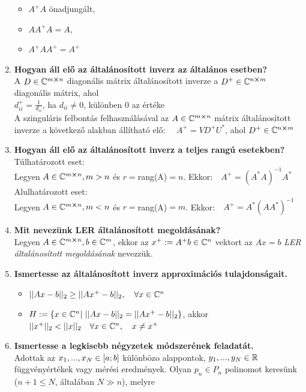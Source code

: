 \documentclass{article}
\begin{document}
\begin{enumerate}
\begin{itemize}
		\item $A^+A$ önadjungált,
		\item $AA^+A=A$,
		\item $A^+AA^+=A^+$
	\end{itemize}
	\item\textbf{Hogyan áll elő az általánosított inverz az általános esetben?}\\[0.1cm]
	A $D\in\mathbb{C}^{m\cross n}$ diagonális mátrix általánosított inverze a $D^+\in\mathbb{C}^{n\cross m}$
	diagonális mátrix, ahol\\[0.1cm]$d_{ii}^+=\frac{1}{d_{ii}}$, ha $d_{ii}\neq0$,
	különben 0 az értéke
	\\[0.1cm]A szinguláris felbontás felhasználásával az $A\in\mathbb{C}^{m\cross n}$ mátrix
	általánosított inverze a következő alakban állítható elő: $\quad A^+=VD^+U^*$, ahol
	$D^+\in\mathbb{C}^{n\cross m}$
	\item\textbf{Hogyan áll elő az általánosított inverz a teljes rangú esetekben?}\\[0.1cm]
	Túlhatározott eset:\\[0.1cm]
	Legyen $A\in\mathbb{C}^{m\cross n},m>n$ és $r=$rang(A)$=n$. Ekkor:$\quad A^+=(A^*A)^{-1}A^*$
	\\[0.1cm]Alulhatározott eset:\\[0.1cm]
	Legyen $A\in\mathbb{C}^{m\cross n},m<n$ és $r=$rang(A)$=m$. Ekkor:$\quad A^+=A^*(AA^*)^{-1}$
	\item\textbf{Mit nevezünk LER általánosított megoldásának?}\\[0.1cm]
	Legyen $A\in\mathbb{C}^{m\cross n},b\in\mathbb{C}^m$, ekkor az $x^+:=A^+b\in\mathbb{C}^n$ vektort az
	$Ax=b$ \textit{LER általánosított megoldásának} nevezzük.
	\item\textbf{Ismertesse az általánosított inverz approximációs tulajdonságait.}
	\begin{itemize}
		\item $||Ax-b||_2\geq||Ax^+-b||_2,\quad\forall x\in\mathbb{C}^n$
		\item $H:=\{x\in\mathbb{C}^n|\text{  }||Ax-b||_2=||Ax^+-b||_2\}$, akkor\\[0.1cm]
		$||x^+||_2<||x||_2\quad\forall x\in\C^n,\quad x\neq x^+$
	\end{itemize}
	\item\textbf{Ismertesse a legkisebb négyzetek módszerének feladatát.}\\[0.1cm]
	Adottak az $x_1,...,x_N\in[a;b]$ különbözo alappontok, $y_1,...,y_N\in\mathbb{R}$
	függvényértékek vagy mérési eredmények. Olyan $p_n\in P_n$ polinomot keresünk
	($n+1\leq N$, általában $N\gg n$), melyre\\[0.1cm]

\end{enumerate}
\end{document}
